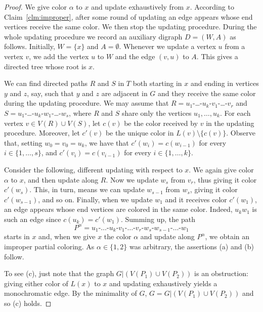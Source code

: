 \documentclass[11pt]{article}
\begin{document}
\begin{proof}
We give color $\alpha$ to $x$ and update exhaustively from $x$.
According to Claim~\ref{clm:improper}, after some round of updating an edge appears whose end vertices receive the same color.
We then stop the updating procedure.
During the whole updating procedure we record an auxiliary digraph $D=(W,A)$ as follows.
Initially, $W=\{x\}$ and $A= \emptyset$.
Whenever we update a vertex $u$ from a vertex $v$, we add the vertex $u$ to $W$ and the edge $(v,u)$ to $A$.
This gives a directed tree whose root is $x$.

We can find directed paths $R$ and $S$ in $T$ both starting in $x$ and ending in vertices $y$ and $z$, say, such that $y$ and $z$ are adjacent in $G$ and they receive the same color during the updating procedure.
We may assume that $R=u_1$-\ldots-$u_k$-$v_1$-\ldots-$v_r$ and $S=u_1$-\ldots-$u_k$-$w_1$-\ldots-$w_s$, where $R$ and $S$ share only the vertices $u_1,\ldots,u_k$.
For each vertex $v \in V(R) \cup V(S)$, let $c(v)$ be the color received by $v$ in the updating procedure.
Moreover, let $c'(v)$ be the unique color in $L(v) \setminus \{c(v)\}$. Observe that, setting $w_0=v_0=u_k$, we have that
$c'(w_i)=c(w_{i-1})$ for every $i \in \{1, \ldots, s\}$,
and $c'(v_i)=c(v_{i-1})$ for every $i \in \{1, \ldots, k\}$.

Consider the following, different updating with respect to $x$.
We again give color $\alpha$ to $x$, and then update along $R$.
Now we update $w_s$ from $v_r$, thus giving it color $c'(w_s)$.
This, in turn, means we can update $w_{s-1}$ from $w_s$, giving it color $c'(w_{s-1})$, and so on.
Finally, when we update $w_1$ and it receives color $c'(w_1)$, an edge appears whose end vertices are colored in the same color.
Indeed, $u_kw_1$ is such an edge since $c(u_k)=c'(w_1)$.
Summing up, the path 
$$ \mbox{$P^\alpha=u_1$-\ldots-$u_k$-$v_1$-\ldots-$v_r$-$w_s$-$w_{s-1}$-\ldots-$w_1$} $$
starts in $x$ and, when we give $x$ the color $\alpha$ and update along $P^{\alpha}$, we obtain an improper partial coloring.
As $\alpha\in \{1,2\}$ was arbitrary, the assertions (a) and (b) follow.

To see (c), just note that the graph $G|(V(P_1) \cup V(P_2))$ is an obstruction: giving either color of $L(x)$ to $x$ and updating exhaustively yields a monochromatic edge.
By the minimality of $G$, $G=G|(V(P_1) \cup V(P_2))$ and so (c) holds.
\end{proof}
\end{document}
